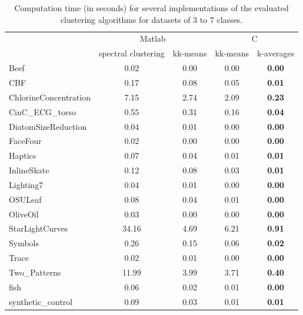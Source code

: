 \documentclass[natbib,smallextended]{svjour3}
\begin{document}
\begin{table}
\begin{center}
\caption{Computation time (in seconds) for several implementations of the evaluated clustering algorithms for datasets of 3 to 7 classes.}
\label{tab:resultSpeed-37}
\begin{tabular}{lcccc}
  & \multicolumn{2}{c}{Matlab} & \multicolumn{2}{c}{C} \\
  & spectral clustering & kk-means & kk-means & k-averages \\
\hline
Beef & 0.02 & 0.00 & 0.00 & \textbf{0.00} \\
CBF & 0.17 & 0.08 & 0.05 & \textbf{0.01} \\
ChlorineConcentration & 7.15 & 2.74 & 2.09 & \textbf{0.23} \\
CinC\_ECG\_torso & 0.55 & 0.31 & 0.16 & \textbf{0.04} \\
DiatomSizeReduction & 0.04 & 0.01 & 0.00 & \textbf{0.00} \\
FaceFour & 0.02 & 0.00 & 0.00 & \textbf{0.00} \\
Haptics & 0.07 & 0.04 & 0.01 & \textbf{0.01} \\
InlineSkate & 0.12 & 0.08 & 0.03 & \textbf{0.01} \\
Lighting7 & 0.04 & 0.01 & 0.00 & \textbf{0.00} \\
OSULeaf & 0.08 & 0.04 & 0.01 & \textbf{0.00} \\
OliveOil & 0.03 & 0.00 & 0.00 & \textbf{0.00} \\
StarLightCurves & 34.16 &  4.69 &  6.21 & \textbf{ 0.91} \\
Symbols & 0.26 & 0.15 & 0.06 & \textbf{0.02} \\
Trace & 0.02 & 0.01 & 0.00 & \textbf{0.00} \\
Two\_Patterns & 11.99 &  3.99 &  3.71 & \textbf{ 0.40} \\
fish & 0.06 & 0.02 & 0.01 & \textbf{0.00} \\
synthetic\_control & 0.09 & 0.03 & 0.01 & \textbf{0.01} \\
\end{tabular}
\end{center}
\end{table}


\end{document}
